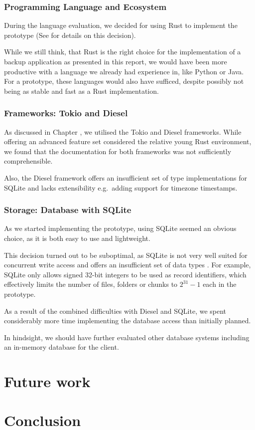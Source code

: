 \subsubsection{Programming Language and Ecosystem}
During the language evaluation, we decided for using Rust to implement the prototype (See  for details on this decision).

While we still think, that Rust is the right choice for the implementation of a backup application as presented in this report, we would have been more productive with a language we already had experience in, like Python or Java. For a prototype, these languages would also have sufficed, despite possibly not being as stable and fast as a Rust implementation.

\subsubsection{Frameworks: Tokio and Diesel}
As discussed in Chapter , we utilised the Tokio and Diesel frameworks. While offering an advanced feature set considered the relative young Rust environment, we found that the documentation for both frameworks was not sufficiently comprehensible.

Also, the Diesel framework offers an insufficient set of type implementations for SQLite and lacks extensibility e.g.~adding support for timezone timestamps.

\subsubsection{Storage: Database with SQLite}
As we started implementing the prototype, using SQLite seemed an obvious choice, as it is both easy to use and lightweight.

This decision turned out to be suboptimal, as SQLite is not very well suited for concurrent write access \cite{sqlite-locking} and offers an insufficient set of data types \cite{sqlite-datatypes}. For example, SQLite only allows signed 32-bit integers to be used as record identifiers, which effectively limits the number of \glspl{file}, folders or \glspl{chunk} to $2^{31}-1$ each in the prototype.

As a result of the combined difficulties with Diesel and SQLite, we spent considerably more time implementing the database access than initially planned.

In hindsight, we should have further evaluated other database systems including an in-memory database for the \gls{client}.

\section{Future work}

\section{Conclusion}

